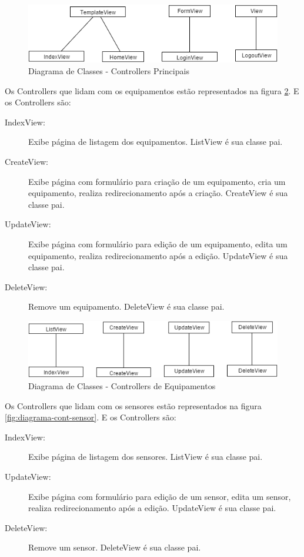\begin{figure}[H]
\centering
\includegraphics[width=14cm,keepaspectratio]{figuras/diagrama_cont_principal.png}
\caption{\label{fig:diagrama-cont-principal} Diagrama de Classes - Controllers Principais}
\end{figure}

Os Controllers que lidam com os equipamentos estão representados na figura \ref{fig:diagrama-cont-equipment}. E os Controllers são:
\begin{description}
	\item[IndexView:] Exibe página de listagem dos equipamentos. ListView é sua classe pai.
	\item[CreateView:] Exibe página com formulário para criação de um equipamento, cria um equipamento, realiza redirecionamento após a criação. CreateView é sua classe pai.
	\item[UpdateView:] Exibe página com formulário para edição de um equipamento, edita um equipamento, realiza redirecionamento após a edição. UpdateView é sua classe pai.
	\item[DeleteView:] Remove um equipamento. DeleteView é sua classe pai.
\end{description} 

\begin{figure}[H]
\centering
\includegraphics[width=14cm,keepaspectratio]{figuras/diagrama_cont_equipment.png}
\caption{\label{fig:diagrama-cont-equipment} Diagrama de Classes - Controllers de Equipamentos}
\end{figure}

Os Controllers que lidam com os sensores estão representados na figura \ref{fig:diagrama-cont-sensor}. E os Controllers são:
\begin{description}
	\item[IndexView:] Exibe página de listagem dos sensores. ListView é sua classe pai.
	\item[UpdateView:] Exibe página com formulário para edição de um sensor, edita um sensor, realiza redirecionamento após a edição. UpdateView é sua classe pai.
	\item[DeleteView:] Remove um sensor. DeleteView é sua classe pai.
\end{description} 

